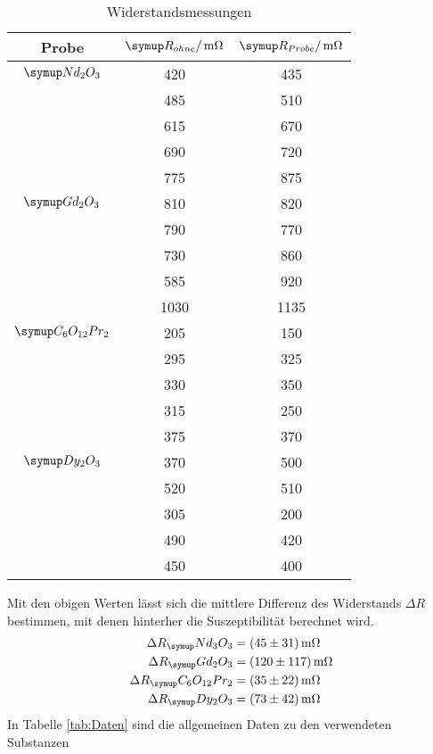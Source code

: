 \begin{table}
  \centering
  \begin{tabular}{c c c}
    \toprule
    Probe & $\su{R_{ohne}/\mOhm}$ &$\su{R_{Probe}}/\mOhm$ \\
    \midrule
    $\su{Nd_2O_3}$   & 420 & 435 \\
                     & 485 & 510 \\
                     & 615 & 670 \\
                     & 690 & 720 \\
                     & 775 & 875 \\ \hline
    $\su{Gd_2O_3}$   & 810 & 820 \\
                     & 790 & 770 \\
                     & 730 & 860 \\
                     & 585 & 920 \\
                     &1030 &1135 \\ \hline
    $\su{C_6O_{12}Pr_2}$  & 205 & 150 \\
                          & 295 & 325 \\
                          & 330 & 350 \\
                          & 315 & 250 \\
                          & 375 & 370 \\ \hline
    $\su{Dy_2O_3}$   & 370 & 500 \\
                     & 520 & 510 \\
                     & 305 & 200 \\
                     & 490 & 420 \\
                     & 450 & 400 \\
    \bottomrule
  \end{tabular}
  \caption{Widerstandsmessungen}
  \label{tab:mess2}
\end{table}
Mit den obigen Werten lässt sich die mittlere Differenz des Widerstands
$\Delta R$ bestimmen, mit denen hinterher die Suszeptibilität berechnet wird.
\begin{align*}
  \Delta R_\su{Nd_3O_3}    &= ( 45 \pm  31) \mOhm \\
  \Delta R_\su{Gd_2O_3}    &= (120 \pm 117) \mOhm \\
  \Delta R_\su{C_6O_{12}Pr_2} &= ( 35 \pm  22) \mOhm \\
  \Delta R_\su{Dy_2O_3}    &= ( 73 \pm  42) \mOhm
\end{align*}
In Tabelle \ref{tab:Daten} sind die allgemeinen Daten zu den verwendeten Substanzen
